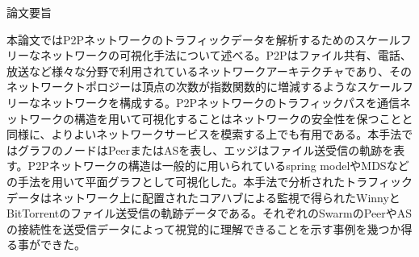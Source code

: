 \documentclass{jsarticle}
\begin{document}
\begin{center} \LARGE{論文要旨} \end{center}
本論文ではP2Pネットワークのトラフィックデータを解析するためのスケールフリーなネットワークの可視化手法について述べる。P2Pはファイル共有、電話、放送など様々な分野で利用されているネットワークアーキテクチャであり、そのネットワークトポロジーは頂点の次数が指数関数的に増減するようなスケールフリーなネットワークを構成する。P2Pネットワークのトラフィックパスを通信ネットワークの構造を用いて可視化することはネットワークの安全性を保つことと同様に、よりよいネットワークサービスを模索する上でも有用である。本手法ではグラフのノードはPeerまたはASを表し、エッジはファイル送受信の軌跡を表す。P2Pネットワークの構造は一般的に用いられているspring modelやMDSなどの手法を用いて平面グラフとして可視化した。本手法で分析されたトラフィックデータはネットワーク上に配置されたコアハブによる監視で得られたWinnyとBitTorrentのファイル送受信の軌跡データである。それぞれのSwarmのPeerやASの接続性を送受信データによって視覚的に理解できることを示す事例を幾つか得る事ができた。
 
\end{document}
